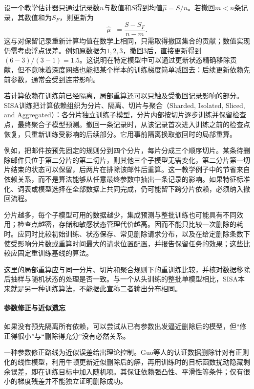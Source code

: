 设一个教学估计器只通过记录数$n$与数值和$S$得到均值$\hat\mu=S/n$。若撤回$m<n$条记录，其数值和为$S_F$，则更新为
\[
 \hat\mu_- =\frac{S-S_F}{n-m}.
\]
这与对保留记录重新计算均值在数学上相同，只需取得撤回集合的贡献；数值实现仍需考虑浮点误差。例如原数据为$1,2,3$，撤回3后，直接更新得到$(6-3)/(3-1)=1.5$。这说明在特定模型中可以通过更新状态精确移除贡献，但不意味着深度网络也能把某个样本的训练梯度简单减回去：后续更新依赖先前参数，通常会受到连带影响。

若计算依赖在训练前已经隔离，局部重算还可以只触及受撤回记录影响的部分。SISA训练把计算依赖组织为分片、隔离、切片与聚合（Sharded, Isolated, Sliced, and Aggregated）：各分片独立训练子模型，分片内部按切片逐步训练并保留检查点，最终聚合子模型预测。撤回一条记录时，从该记录首次进入训练之前的检查点恢复，只重新训练受影响的后续部分。它用事前隔离换取撤回时的局部重算。

例如，把邮件按预先固定的规则分到四个分片，每片分成三个顺序切片。某条待删除邮件只位于第二分片的第二切片，则其他三个子模型无需变化，第二分片第一切片结束的状态可以保留，后两片在排除该邮件后重算。这一教学例子中的节省来自依赖关系，而不是算法能够从任意最终参数中抽出一条记录的影响。如果特征标准化、词表或模型选择在全部数据上共同完成，仍可能留下跨分片依赖，必须纳入撤回流程。

分片越多，每个子模型可用的数据越少，集成预测与整批训练也可能具有不同效用；检查点越密，存储和敏感状态管理代价越高。因而不能只比较一次删除的耗时。应同时比较初始训练、状态保存、常见删除请求分布，以及在给定删除条数下使受影响分片数或重算时间最大的请求位置配置，并报告保留任务的效果；这些比较应固定重训练基线的算法。

这里的局部重算应与同一分片、切片和聚合规则下的重训练比较，并核对数据移除后抽样与随机状态的处理是否一致。与一个从头训练的整批单模型相比，SISA本来就是另一种训练算法，不能据此宣称二者输出分布相同。

\paragraph{参数修正与近似遗忘}

如果没有预先隔离所有依赖，可以尝试从已有参数出发逼近删除后的模型，但“修正得很小”与“删除得充分”没有必然关系。

一种参数修正路线为近似误差给出理论控制。Guo等人的认证数据删除针对有正则化的线性模型，利用牛顿更新近似删除后的解，再用训练时的目标函数扰动隐藏剩余误差，即在训练目标中加入随机项。其保证依赖强凸性、平滑性等条件；仅有很小的梯度残差并不能独立证明删除成功。

